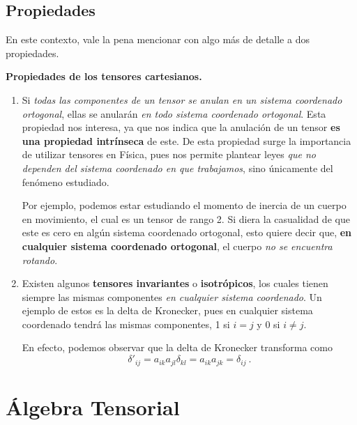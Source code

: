 \subsection{Propiedades}

En este contexto, vale la pena mencionar con algo más de detalle a dos propiedades.

\begin{propiedad}
    \textbf{Propiedades de los tensores cartesianos.}

    \begin{enumerate}
        \item Si \emph{todas las componentes de un tensor se anulan en un sistema coordenado ortogonal}, ellas se anularán \emph{en todo sistema coordenado ortogonal}.  Esta propiedad nos interesa, ya que nos indica que la anulación de un tensor \textbf{es una propiedad intrínseca} de este. De esta propiedad surge la importancia de utilizar tensores en Física, pues nos permite plantear leyes \emph{que no dependen del sistema coordenado en que trabajamos}, sino únicamente del fenómeno estudiado.
        
        Por ejemplo, podemos estar estudiando el momento de inercia de un cuerpo en movimiento, el cual es un tensor de rango 2. Si diera la casualidad de que este es cero en algún sistema coordenado ortogonal, esto quiere decir que, \textbf{en cualquier sistema coordenado ortogonal}, el cuerpo \emph{no se encuentra rotando}.
    
        \item Existen algunos \textbf{tensores invariantes} o \textbf{isotrópicos}, los cuales tienen siempre las mismas componentes \emph{en cualquier sistema coordenado}. Un ejemplo de estos es la delta de Kronecker, pues en cualquier sistema coordenado tendrá las mismas componentes, 1 si $i=j$ y 0 si $i\neq j$.
        
        En efecto, podemos observar que la delta de Kronecker transforma como
        \begin{equation}
            \delta'_{ij} = a_{ik} a_{jl} \delta_{kl} = a_{ik} a_{jk} = \delta_{ij} \ .
        \end{equation}
    \end{enumerate}
\end{propiedad}



\section{Álgebra Tensorial}

